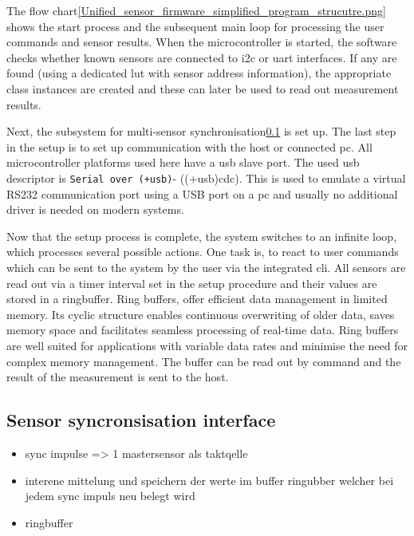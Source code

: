 The flow
chart\ref{Unified_sensor_firmware_simplified_program_strucutre.png}
shows the start process and the subsequent main loop for processing the
user commands and sensor results. When the microcontroller is started,
the software checks whether known sensors are connected to \gls{i2c} or
\gls{uart} interfaces. If any are found (using a dedicated \gls{lut}
with sensor address information), the appropriate class instances are
created and these can later be used to read out measurement results.

Next, the subsystem for multi-sensor
synchronisation\ref{sensor-syncronsisation-interface} is set up. The
last step in the setup is to set up communication with the host or
connected \gls{pc}. All microcontroller platforms used here have a
\gls{usb} slave port. The used usb descriptor is
\passthrough{\lstinline!Serial over (+usb)!}- ((+usb)\gls{cdc}). This is
used to emulate a virtual RS232 communication port using a USB port on a
\gls{pc} and usually no additional driver is needed on modern systems.

Now that the setup process is complete, the system switches to an
infinite loop, which processes several possible actions. One task is, to
react to user commands which can be sent to the system by the user via
the integrated \gls{cli}. All sensors are read out via a timer interval
set in the setup procedure and their values are stored in a ringbuffer.
Ring buffers, offer efficient data management in limited memory. Its
cyclic structure enables continuous overwriting of older data, saves
memory space and facilitates seamless processing of real-time data. Ring
buffers are well suited for applications with variable data rates and
minimise the need for complex memory management. The buffer can be read
out by command and the result of the measurement is sent to the host.

\hypertarget{sensor-syncronsisation-interface}{%
\subsection{Sensor syncronsisation
interface}\label{sensor-syncronsisation-interface}}

\begin{itemize}
\tightlist
\item
  sync impulse =\textgreater{} 1 mastersensor als taktqelle
\item
  interene mittelung und speichern der werte im buffer ringubber welcher
  bei jedem sync impuls neu belegt wird
\item
  ringbuffer
\end{itemize}

